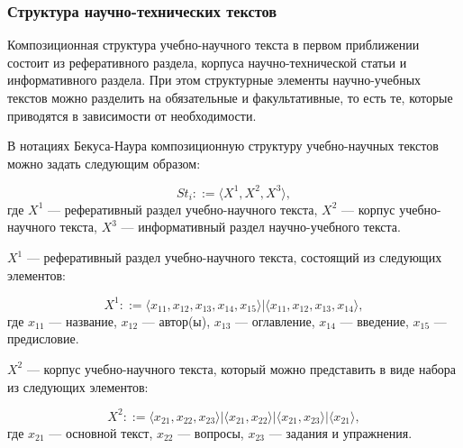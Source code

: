 



\subsubsection{Структура научно-технических текстов}

Композиционная структура учебно-научного текста в первом приближении состоит из реферативного раздела, корпуса научно-технической статьи и информативного раздела.
При этом структурные элементы научно-учебных текстов можно разделить на обязательные и факультативные, то есть те, которые приводятся в зависимости от необходимости.~\cite{butenko2021}

В нотациях Бекуса-Наура композиционную структуру учебно-научных текстов можно задать следующим образом:

$$
St_{i} ::= \langle X^{1}, X^{2}, X^{3}\rangle ,
$$
где $ X^{1} $ — реферативный раздел учебно-научного текста, $ X^{2} $ — корпус учебно-научного текста, $ X^{3} $ — информативный раздел научно-учебного текста.

$ X^{1} $ — реферативный раздел учебно-научного текста, состоящий из следующих элементов:

$$
X^{1} ::= \langle x_{11}, x_{12}, x_{13}, x_{14}, x_{15}\rangle |\langle x_{11}, x_{12}, x_{13}, x_{14}\rangle ,
$$
где $ x_{11} $ — название, $ x_{12} $ — автор(ы), $ x_{13} $ — оглавление, $ x_{14} $ — введение, $ x_{15} $ — предисловие.

$ X^{2} $ — корпус учебно-научного текста, который можно представить в виде набора из следующих элементов:

$$
X^{2} ::= \langle x_{21}, x_{22}, x_{23}\rangle |\langle x_{21}, x_{22}\rangle |\langle x_{21}, x_{23}\rangle |\langle x_{21}\rangle ,
$$
где $ x_{21} $ — основной текст, $ x_{22} $ — вопросы, $ x_{23} $ — задания и упражнения.

